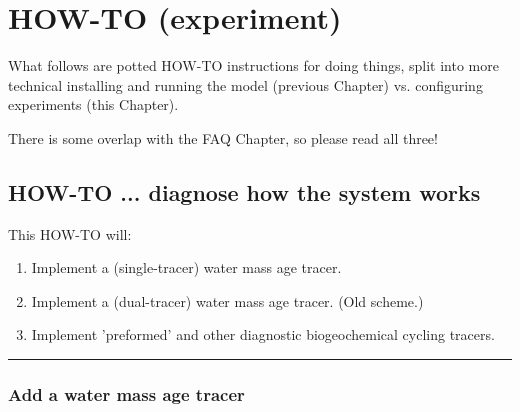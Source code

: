 
\cleardoublepage


\chapter{HOW-TO (experiment)}\label{ch:how-to-experiment}

\hfill \break
\vspace{24mm}

\Large
What follows are potted HOW-TO instructions for doing things, split into more technical installing and running the model (previous Chapter) vs. configuring experiments (this Chapter).
\vspace{2mm}

There is some overlap with the FAQ Chapter, so please read all three!
\normalsize

\newpage

\section{HOW-TO ... diagnose how the system works}

This HOW-TO will:
\vspace{1mm}
\begin{enumerate}[noitemsep]
\item Implement a (single-tracer) water mass age tracer.
\item Implement a (dual-tracer) water mass age tracer. (Old scheme.)
\item Implement 'preformed' and other diagnostic biogeochemical cycling tracers.
\end{enumerate}

\noindent\rule{4cm}{0.5pt}

%
\newpage
\subsection*{Add a water mass age tracer}
\vspace{2mm}

